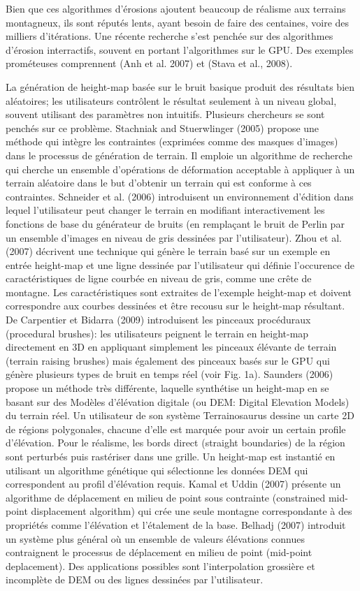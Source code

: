 \documentclass[11pt]{article}
\begin{document}
Bien que ces algorithmes d'érosions ajoutent beaucoup de réalisme aux terrains montagneux, ils sont réputés lents, ayant besoin de faire des centaines, voire des milliers d'itérations. Une récente recherche s'est penchée sur des algorithmes d'érosion interractifs, souvent en portant l'algorithmes sur le GPU. Des exemples prométeuses comprennent (Anh et al. 2007) et (Stava et al., 2008). \newline

La génération de height-map basée sur le bruit basique produit des résultats bien aléatoires; les utilisateurs contrôlent le résultat seulement à un niveau global, souvent utilisant des paramètres non intuitifs. Plusieurs chercheurs se sont penchés sur ce problème. Stachniak and Stuerwlinger (2005) propose une méthode qui intègre les contraintes (exprimées comme des masques d'images) dans le processus de génération de terrain. Il emploie un algorithme de recherche qui cherche un ensemble d'opérations de déformation acceptable à appliquer à un terrain aléatoire dans le but d'obtenir un terrain qui est conforme à ces contraintes. Schneider et al. (2006) introduisent un environnement d'édition dans lequel l'utilisateur peut changer le terrain en modifiant interactivement les fonctions de base du générateur de bruits (en remplaçant le bruit de Perlin par un ensemble d'images en niveau de gris dessinées par l'utilisateur). Zhou et al. (2007) décrivent une technique qui génère le terrain basé sur un exemple en entrée height-map et une ligne dessinée par l'utilisateur qui définie l'occurence de caractéristiques de ligne courbée en niveau de gris, comme une crête de montagne. Les caractéristiques sont extraites de l'exemple height-map et doivent correspondre aux courbes dessinées et être recousu sur le height-map résultant. De Carpentier et Bidarra (2009) introduisent les pinceaux procéduraux (procedural brushes): les utilisateurs peignent le terrain en height-map directement en 3D en appliquant simplement les pinceaux élévante de terrain (terrain raising brushes) mais également des pinceaux basés sur le GPU qui génère plusieurs types de bruit en temps réel (voir Fig. 1a). Saunders (2006) propose un méthode très différente, laquelle synthétise un height-map en se basant sur des Modèles d'élévation  digitale (ou DEM: Digital Elevation Models) du terrain réel. Un utilisateur de son système Terrainosaurus dessine un carte 2D de régions polygonales, chacune d'elle est marquée pour avoir un certain profile d'élévation. Pour le réalisme, les bords direct (straight boundaries) de la région sont perturbés puis rastériser dans une grille. Un height-map est instantié en utilisant un algorithme génétique qui sélectionne les données DEM qui correspondent au profil d'élévation requis. Kamal et Uddin (2007) présente un algorithme de déplacement en milieu de point sous contrainte (constrained mid-point displacement algorithm) qui crée une seule montagne correspondante à des propriétés comme l'élévation et l'étalement de la base. Belhadj (2007) introduit un système plus général où un ensemble de valeurs élévations connues contraignent le processus de déplacement en milieu de point (mid-point deplacement). Des applications possibles sont l'interpolation grossière et incomplète de DEM ou des lignes dessinées par l'utilisateur. 
\end{document}
